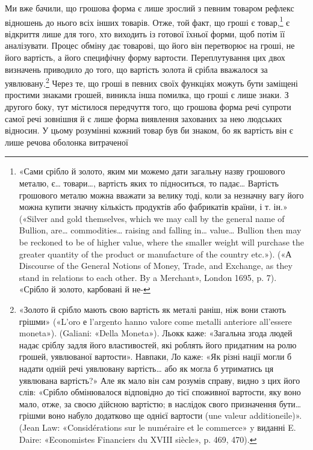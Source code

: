Ми вже бачили, що грошова форма є лише зрослий з певним
товаром рефлекс відношень до нього всіх інших товарів. Отже,
той факт, що гроші є товар,\footnote{
«Сами срібло й золото, яким ми можемо дати загальну назву грошового
металю, є\dots{} товари\dots{}, вартість яких то підноситься, то падає\dots{}
Вартість грошового металю можна вважати за велику тоді, коли за
незначну вагу його можна купити значну кількість продуктів або фабрикатів
 країни, і т. ін.» («Silver and gold themselves, which we may call
by the general name of Bullion, are\dots{} commodities\dots{} raising and falling
in\dots{} value\dots{} Bullion then may be reckoned to be of higher value, where
the smaller weight will purchase the greater quantity of the product or
manufacture of the country etc.»). («А Discourse of the General Notions
of Money, Trade, and Exchange, as they stand in relations to each other.
By a Merchant», London 1695, p. 7). «Срібло й золото, карбовані й не-
} є відкриття лише для того, хто
виходить із готової їхньої форми, щоб потім її аналізувати. Процес
обміну дає товарові, що його він перетворює на гроші, не його
вартість, а його специфічну форму вартости. Переплутування
цих двох визначень приводило до того, що вартість золота й
срібла вважалося за уявлювану.\footnote{
«Золото й срібло мають свою вартість як металі раніш, ніж вони
стають грішми» («L’oro е l’argento hanno valore come metalli anteriore
all’essere moneta»). (Galiani: «Della Moneta»). Льокк каже: «Загальна
згода людей надає сріблу задля його властивостей, які роблять
його придатним на ролю грошей, уявлюваної вартости». Навпаки, Ло
каже: «Як різні нації могли б надати одній речі уявлювану вартість\dots{}
або як могла б утриматись ця уявлювана вартість?» Але як мало він сам
розумів справу, видно з цих його слів: «Срібло обмінювалося відповідно
до тієї споживної вартости, яку воно мало, отже, за своєю дійсною вартістю;
в наслідок свого призначення бути\dots{} грішми воно набуло додатково
ще однієї вартости (une valeur additioneile)». (Jean Law: «Considérations
sur le numéraire et le commerce» y виданні E. Daire: «Economistes
Financiers du XVIII siècle», p. 469, 470).
} Через те, що гроші в певних
своїх функціях можуть бути заміщені простими знаками грошей,
виникла інша помилка, що гроші є лише знаки. З другого боку,
тут містилося передчуття того, що грошова форма речі супроти
самої речі зовнішня й є лише форма виявлення захованих за нею
людських відносин. У цьому розумінні кожний товар був би
знаком, бо як вартість він є лише речова оболонка витраченої
